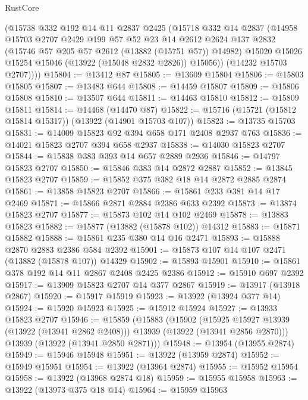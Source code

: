 \begin{lexlean}{RustCore}
\begin{coremodule}
        (@15738
          @332
          @192
          @14
          @11
          @2837
          @2425
          (@15718
            @332
            @14
            @2837
            (@14958
              @15703
              @2707
              @2429
              @199
              @57
              @52
              @23
              @14
              @2612
              @2624
              @137
              @2832
              (@15746 @57 @205 @57 @2612 (@13882 (@15751 @57)) @14982)
              @15020
              @15026
              @15254
              @15046
              (@13922 (@15048 @2832 @2826))
              @15056))
          (@14232 @15703 @2707))))
@15804 := @13412 @87
@15805 := @13609 @15804
@15806 := @15803 @15805
@15807 := @13483 @644
@15808 := @14459 @15807
@15809 := @15806 @15808
@15810 := @13507 @644
@15811 := @14463 @15810
@15812 := @15809 @15811
@15814 := @14468 (@14470 @87)
@15822 := @15716 (@15721 (@15812 @15814 @15317)) (@13922 (@14901 @15703 @107))
@15823 := @13735 @15703
@15831 := @14009 @15823 @92 @394 @658 @171 @2408 @2937 @763
@15836 := @14021 @15823 @2707 @394 @658 @2937
@15838 := @14030 @15823 @2707
@15844 := @15838 @383 @393 @14 @657 @2889 @2936
@15846 := @14797 @15823 @2707
@15850 := @15846 @383 @14 @2872 @2887
@15852 := @13845 @15823 @2707
@15859 := @15852 @375 @382 @18 @14 @2872 @2885 @2874
@15861 := @13858 @15823 @2707
@15866 := @15861 @233 @381 @14 @17 @2469
@15871 := @15866 @2871 @2884 @2386 @633 @2392
@15873 := @13874 @15823 @2707
@15877 := @15873 @102 @14 @102 @2469
@15878 := @13883 @15823
@15882 := @15877 (@13882 (@15878 @102)) @14312
@15883 := @15871 @15882
@15888 := @15861 @235 @380 @14 @16 @2471
@15893 := @15888 @2870 @2883 @2386 @584 @2392
@15901 := @15873 @107 @14 @107 @2471 (@13882 (@15878 @107)) @14329
@15902 := @15893 @15901
@15910 := @15861 @378 @192 @14 @11 @2867 @2408 @2425 @2386
@15912 := @15910 @697 @2392
@15917 := @13909 @15823 @2707 @14 @377 @2867
@15919 := @13917 (@13918 @2867)
@15920 := @15917 @15919
@15923 := @13922 (@13924 @377 @14)
@15924 := @15920 @15923
@15925 := @15912 @15924
@15927 := @13933 @15823 @2707
@15946 := @15859
    (@15883
      (@15902
        (@15925 @15927 @13939 (@13922 (@13941 @2862 @2408)))
        @13939
        (@13922 (@13941 @2856 @2870)))
      @13939
      (@13922 (@13941 @2850 @2871)))
@15948 := @13954 (@13955 @2874)
@15949 := @15946 @15948
@15951 := @13922 (@13959 @2874)
@15952 := @15949 @15951
@15954 := @13922 (@13964 @2874)
@15955 := @15952 @15954
@15958 := @13922 (@13968 @2874 @18)
@15959 := @15955 @15958
@15963 := @13922 (@13973 @375 @18 @14)
@15964 := @15959 @15963

\end{coremodule}
\end{lexlean}

